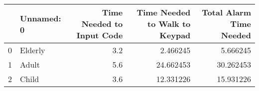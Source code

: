\begin{tabular}{llrrr}
\toprule
{} & Unnamed: 0 &  Time Needed to Input Code &  Time Needed to Walk to Keypad &  Total Alarm Time Needed \\
\midrule
0 &    Elderly &                        3.2 &                       2.466245 &                 5.666245 \\
1 &      Adult &                        5.6 &                      24.662453 &                30.262453 \\
2 &      Child &                        3.6 &                      12.331226 &                15.931226 \\
\bottomrule
\end{tabular}
